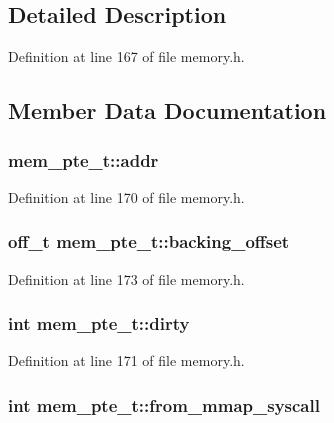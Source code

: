\subsection{Detailed Description}


Definition at line 167 of file memory.h.

\subsection{Member Data Documentation}
\subsubsection[{addr}]{ {\bf mem\_\-pte\_\-t::addr}}\label{structmem__pte__t_39b0246f7437842601051bcfeb357afe}




Definition at line 170 of file memory.h.
\subsubsection[{backing\_\-offset}]{\setlength{\rightskip}{0pt plus 5cm}off\_\-t {\bf mem\_\-pte\_\-t::backing\_\-offset}}\label{structmem__pte__t_2544b9c6a71ca2d4aa078ce67d1c7f1f}




Definition at line 173 of file memory.h.
\subsubsection[{dirty}]{\setlength{\rightskip}{0pt plus 5cm}int {\bf mem\_\-pte\_\-t::dirty}}\label{structmem__pte__t_60d1c4432d33e696a3efa8df7b1be246}




Definition at line 171 of file memory.h.
\subsubsection[{from\_\-mmap\_\-syscall}]{\setlength{\rightskip}{0pt plus 5cm}int {\bf mem\_\-pte\_\-t::from\_\-mmap\_\-syscall}}\label{structmem__pte__t_6bf6da46b99c3f882f588fb4710c5802}




